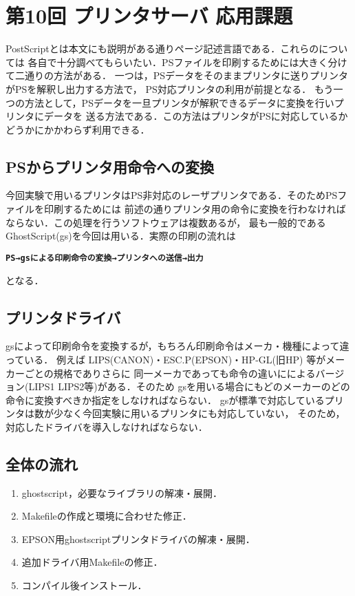 \section{第10回 プリンタサーバ 応用課題}
PostScriptとは本文にも説明がある通りページ記述言語である．これらの\textbf{}については
各自で十分調べてもらいたい．PSファイルを印刷するためには大きく分けて二通りの方法がある．
一つは，PSデータをそのままプリンタに送りプリンタがPSを解釈し出力する方法で，
PS対応プリンタの利用が前提となる．
もう一つの方法として，PSデータを一旦プリンタが解釈できるデータに変換を行いプリンタにデータを
送る方法である．この方法はプリンタがPSに対応しているかどうかにかかわらず利用できる．
\subsection*{PSからプリンタ用命令への変換}
今回実験で用いるプリンタはPS非対応のレーザプリンタである．そのためPSファイルを印刷するためには
前述の通りプリンタ用の命令に変換を行わなければならない．この処理を行うソフトウェアは複数あるが，
最も一般的であるGhostScript(gs)を今回は用いる．実際の印刷の流れは
\begin{center}
\begin{breakbox}
\begin{alltt}
\bf{PS → gsによる印刷命令の変換 → プリンタへの送信 → 出力}
\end{alltt}
\end{breakbox}
\end{center}
となる．
\subsection*{プリンタドライバ}
gsによって印刷命令を変換するが，もちろん印刷命令はメーカ・機種によって違っている．
例えば LIPS(CANON)・ESC.P(EPSON)・HP-GL(旧HP) 等がメーカーごとの規格でありさらに
同一メーカであっても命令の違いにによるバージョン(LIPS1 LIPS2等)がある．そのため
gsを用いる場合にもどのメーカーのどの命令に変換すべきか指定をしなければならない．
gsが標準で対応しているプリンタは数が少なく今回実験に用いるプリンタにも対応していない，
そのため，対応したドライバを導入しなければならない．
\subsection*{全体の流れ}
\begin{enumerate}
\item ghostscript，必要なライブラリの解凍・展開．
\item Makefileの作成と環境に合わせた修正．
\item EPSON用ghostscriptプリンタドライバの解凍・展開．
\item 追加ドライバ用Makefileの修正．
\item コンパイル後インストール．
\end{enumerate}

